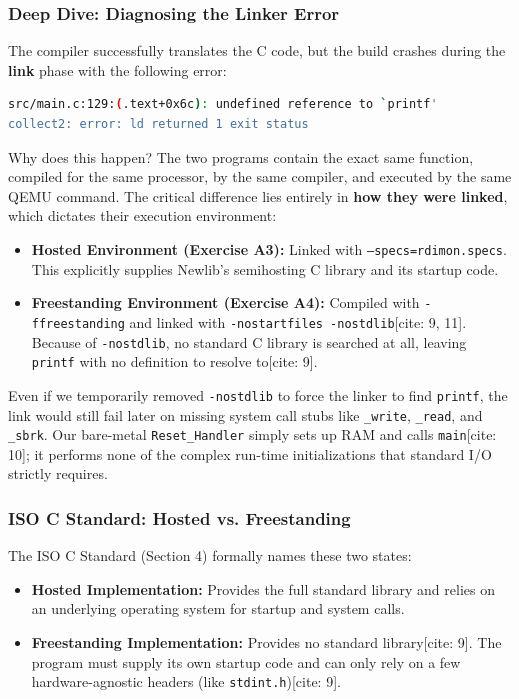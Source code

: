 \subsubsection{Deep Dive: Diagnosing the Linker Error}
The compiler successfully translates the C code, but the build crashes during the \textbf{link} phase with the following error:
\begin{lstlisting}[language=bash]
src/main.c:129:(.text+0x6c): undefined reference to `printf'
collect2: error: ld returned 1 exit status
\end{lstlisting}

Why does this happen? The two programs contain the exact same function, compiled for the same processor, by the same compiler, and executed by the same QEMU command. The critical difference lies entirely in \textbf{how they were linked}, which dictates their execution environment:
\begin{itemize}
    \item \textbf{Hosted Environment (Exercise A3):} Linked with \texttt{--specs=rdimon.specs}. This explicitly supplies Newlib's semihosting C library and its startup code.
    \item \textbf{Freestanding Environment (Exercise A4):} Compiled with \texttt{-ffreestanding} and linked with \texttt{-nostartfiles -nostdlib}[cite: 9, 11]. Because of \texttt{-nostdlib}, no standard C library is searched at all, leaving \texttt{printf} with no definition to resolve to[cite: 9]. 
\end{itemize}

Even if we temporarily removed \texttt{-nostdlib} to force the linker to find \texttt{printf}, the link would still fail later on missing system call stubs like \texttt{\_write}, \texttt{\_read}, and \texttt{\_sbrk}. Our bare-metal \texttt{Reset\_Handler} simply sets up RAM and calls \texttt{main}[cite: 10]; it performs none of the complex run-time initializations that standard I/O strictly requires.

\subsubsection{ISO C Standard: Hosted vs. Freestanding}
The ISO C Standard (Section 4) formally names these two states:
\begin{itemize}
    \item \textbf{Hosted Implementation:} Provides the full standard library and relies on an underlying operating system for startup and system calls.
    \item \textbf{Freestanding Implementation:} Provides no standard library[cite: 9]. The program must supply its own startup code and can only rely on a few hardware-agnostic headers (like \texttt{stdint.h})[cite: 9].
\end{itemize}

